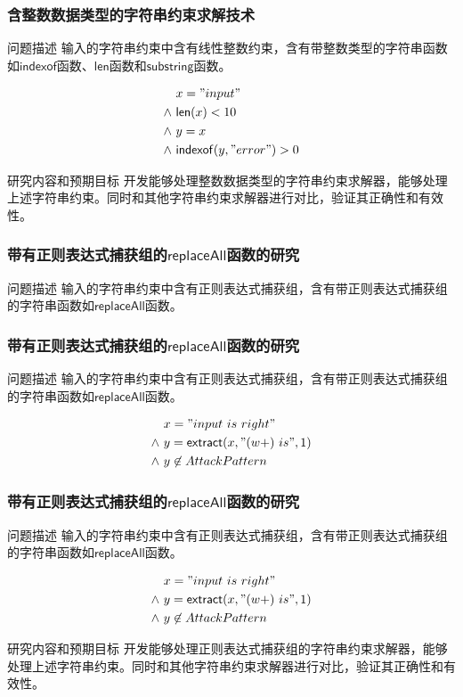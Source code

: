 \documentclass[landscape]{beamer}
\newcommand{\replaceall}{\mathsf{replaceAll}}
\newcommand{\indexof}{\mathsf{indexof}}
\newcommand{\substring}{\mathsf{substring}}
\newcommand{\len}{\mathsf{len}}
\newcommand{\extract}{\mathsf{extract}}
\begin{document}
\begin{frame}[fragile, t]
  \frametitle{含整数数据类型的字符串约束求解技术}
  \begin{block}{问题描述}
    输入的字符串约束中含有线性整数约束，含有带整数类型的字符串函数如$\indexof$函数、$\len$函数和$\substring$函数。
  \end{block}
  \begin{align*}
    & \ x = "input" \\
    \wedge & \ \len(x) < 10\\
    \wedge &\ y = x\\
    \wedge &\ \indexof(y, "error") > 0\\
  \end{align*}
  \begin{block}{研究内容和预期目标}
    开发能够处理整数数据类型的字符串约束求解器，能够处理上述字符串约束。同时和其他字符串约束求解器进行对比，验证其正确性和有效性。
  \end{block}
\end{frame}

\begin{frame}[fragile, t]
  \frametitle{带有正则表达式捕获组的$\replaceall$函数的研究}
  \begin{block}{问题描述}
    输入的字符串约束中含有正则表达式捕获组，含有带正则表达式捕获组的字符串函数如$\replaceall$函数。
  \end{block}
\end{frame}

\begin{frame}[fragile, t]
  \frametitle{带有正则表达式捕获组的$\replaceall$函数的研究}
  \begin{block}{问题描述}
    输入的字符串约束中含有正则表达式捕获组，含有带正则表达式捕获组的字符串函数如$\replaceall$函数。
  \end{block}
  \begin{align*}
    & \ x = "input \ is\ right" \\
    \wedge &\ y = \extract(x, "(w+)\ is", 1)\\
    \wedge &\ y\not \in AttackPattern\\
  \end{align*}
\end{frame}

\begin{frame}[fragile, t]
  \frametitle{带有正则表达式捕获组的$\replaceall$函数的研究}
  \begin{block}{问题描述}
    输入的字符串约束中含有正则表达式捕获组，含有带正则表达式捕获组的字符串函数如$\replaceall$函数。
  \end{block}
  \begin{align*}
    & \ x = "input \ is\ right" \\
    \wedge &\ y = \extract(x, "(w+)\ is", 1)\\
    \wedge &\ y\not \in AttackPattern\\
  \end{align*}
  \begin{block}{研究内容和预期目标}
    开发能够处理正则表达式捕获组的字符串约束求解器，能够处理上述字符串约束。同时和其他字符串约束求解器进行对比，验证其正确性和有效性。
  \end{block}
\end{frame}
\end{document}
